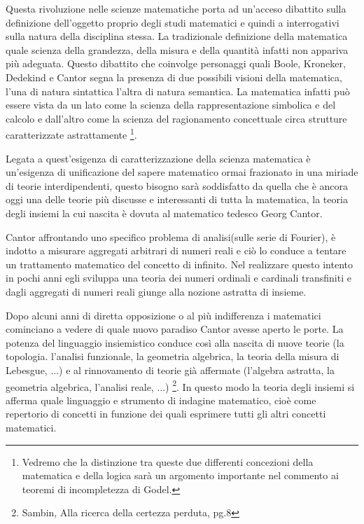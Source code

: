 Questa rivoluzione nelle scienze matematiche porta ad un'acceso dibattito
sulla definizione dell'oggetto proprio degli studi matematici e quindi
a interrogativi sulla natura della disciplina stessa. La tradizionale
definizione della matematica quale scienza della grandezza, della
misura e della quantità infatti non appariva più adeguata. Questo
dibattito che coinvolge personaggi quali Boole, Kroneker, Dedekind
e Cantor segna la presenza di due possibili visioni della matematica,
l'una di natura sintattica l'altra di natura semantica. La matematica
infatti può essere vista da un lato come la scienza della rappresentazione
simbolica e del calcolo e dall'altro come la scienza del ragionamento
concettuale circa strutture caratterizzate astrattamente %
\footnote{Vedremo che la distinzione tra queste due differenti concezioni della
matematica e della logica sarà un argomento importante nel commento
ai teoremi di incompletezza di Godel.%
}.

Legata a quest'esigenza di caratterizzazione della scienza matematica
è un'esigenza di unificazione del sapere matematico ormai frazionato
in una miriade di teorie interdipendenti, questo bisogno sarà soddisfatto
da quella che è ancora oggi una delle teorie più discusse e interessanti
di tutta la matematica, la teoria degli insiemi la cui nascita è dovuta
al matematico tedesco Georg Cantor.

Cantor affrontando uno specifico problema di analisi(sulle serie di
Fourier), è indotto a misurare aggregati arbitrari di numeri reali
e ciò lo conduce a tentare un trattamento matematico del concetto
di infinito. Nel realizzare questo intento in pochi anni egli sviluppa
una teoria dei numeri ordinali e cardinali transfiniti e dagli aggregati
di numeri reali giunge alla nozione astratta di insieme.

Dopo alcuni anni di diretta opposizione o al più indifferenza i matematici
cominciano a vedere di quale nuovo paradiso Cantor avesse aperto le
porte. La potenza del linguaggio insiemistico conduce così alla nascita
di nuove teorie (la topologia. l'analisi funzionale, la geometria
algebrica, la teoria della misura di Lebesgue, ...) e al rinnovamento
di teorie già affermate (l'algebra astratta, la geometria algebrica,
l'analisi reale, ...)%
\footnote{Sambin, Alla ricerca della certezza perduta, pg.8%
}. In questo modo la teoria degli insiemi si afferma quale linguaggio
e strumento di indagine matematico, cioè come repertorio di concetti
in funzione dei quali esprimere tutti gli altri concetti matematici.

